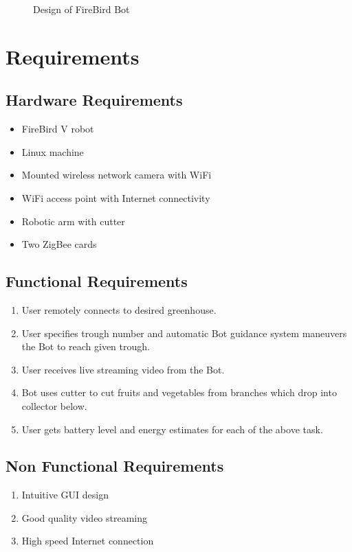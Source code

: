 \documentclass[a4paper, 12pt]{article}
\begin{document}
\begin{figure}

\caption{Design of FireBird Bot}
\label{fig-bot}
\end{figure}

\section{Requirements}
\subsection{Hardware Requirements}
\begin{itemize}
 \item FireBird V robot
 \item Linux machine
 \item Mounted wireless network camera with WiFi
 \item WiFi access point with Internet connectivity
 \item Robotic arm with cutter
 \item Two ZigBee cards
\end{itemize}

\subsection{Functional Requirements}
\begin{enumerate}
 \item User remotely connects to desired greenhouse.
 \item User specifies trough number and automatic Bot guidance system maneuvers the Bot to reach given trough.
 \item User receives live streaming video from the Bot.
 \item Bot uses cutter to cut fruits and vegetables from branches which drop into collector below.
 \item User gets battery level and energy estimates for each of the above task.
\end{enumerate}

\subsection{Non Functional Requirements}
\begin{enumerate}
 \item Intuitive GUI design
 \item Good quality video streaming
 \item High speed Internet connection
\end{enumerate}
\end{document}
